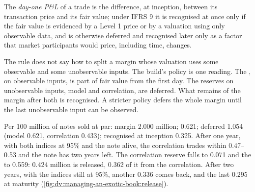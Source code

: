 \begin{definition}\label{def:dv:managing-an-exotic-book:dayone}
The \emph{day-one P\&L} of a trade is the difference, at inception, between its transaction price and its fair value; under IFRS 9 it is
recognised at once only if the fair value is evidenced by a Level 1 price or by a valuation using only observable data, and is otherwise deferred and recognised
later only as a factor that market participants would price, including time, changes.
\end{definition}

The rule does not say how to split a margin whose valuation uses some observable and some unobservable inputs. The build's policy is one reading. The , on observable inputs, is part of fair value from the first day. The reserves on unobservable inputs, model and correlation, are deferred. What remains of the
margin after both is recognised. A stricter policy defers the whole margin until the last unobservable input can be observed.

\begin{example}\label{ex:dv:managing-an-exotic-book:dayone}
Per 100 million of notes sold at par: margin 2.000 million;  0.621; deferred 1.054 (model 0.621, correlation 0.433); recognised at inception
0.325. After one year, with both indices at 95\% and the note alive, the correlation trades within 0.47--0.53 and the note has two years left. The correlation
reserve falls to 0.071 and the  to 0.559: 0.424 million is released, 0.362 of it from the correlation. After two years, with the indices still at 95\%,
another 0.336 comes back, and the last 0.295 at maturity (\cref{fig:dv:managing-an-exotic-book:release}).
\end{example}

